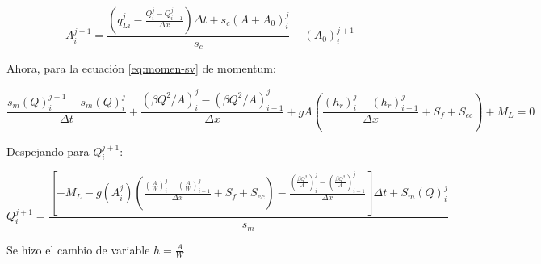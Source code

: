 \documentclass{article}
\begin{document}
\begin{tcolorbox}
\begin{equation}
  \label{eq:cont-sim}
  A_{i}^{j+1} = \frac{\left(q_{Li}^{j} - \frac{Q_{i}^{j} - Q_{i-1}^{j} }{\Delta x}  \right) \Delta t + s_{c} (A + A_{0})_{i}^{j}}{s_{c}} - (A_{0})_{i}^{j+1}
\end{equation}
  
\end{tcolorbox}


Ahora, para la ecuación \ref{eq:momen-sv} de momentum:

\[
\frac{s_{m} (Q)_{i}^{j+1} - s_{m}(Q)_{i}^{j} }{\Delta t} + \frac{(\beta Q^{2}/A)_{i}^{j} - (\beta Q^{2} /A)_{i-1}^{j} }{\Delta x} + gA \left( \frac{(h_{r})_{i}^{j} - (h_{r})_{i-1}^{j}}{\Delta x} + S_{f} + S_{ec}   \right) + M_{L} = 0
\]

Despejando para $Q_{i}^{j+1}$:

\begin{tcolorbox}
\begin{equation}
  \label{eq:momen-sim}
  Q_{i}^{j+1} = \frac{\left[ -M_{L} - g(A_{i}^{j}) \left(\frac{\left(\frac{A}{W}\right)_{i}^{j} - \left(\frac{A}{W}\right)_{i-1}^{j} }{\Delta x} + S_{f} + S_{ec}  \right) - \frac{ \left( \frac{\beta Q^{2}}{A} \right)_{i}^{j} - \left( \frac{\beta Q^{2}}{A} \right)_{i-1}^{j}  }{\Delta x}           \right] \Delta t + S_{m} (Q)_{i}^{j}}{s_{m}}
\end{equation}

  
\end{tcolorbox}


Se hizo el cambio de variable $h = \frac{A}{W}$
\end{document}
